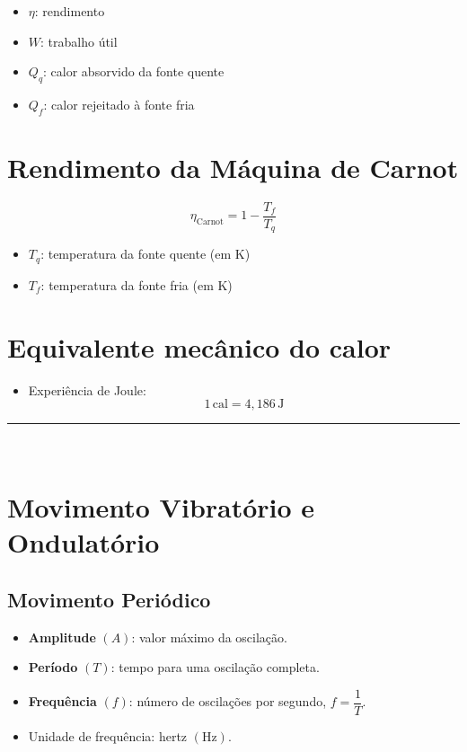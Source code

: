 \documentclass[a4paper,12pt]{article}
\begin{document}
\begin{multicols}{2}
\begin{itemize}
  \item \( \eta \): rendimento
  \item \( W \): trabalho útil
  \item \( Q_q \): calor absorvido da fonte quente
  \item \( Q_f \): calor rejeitado à fonte fria
\end{itemize}

\section{Rendimento da Máquina de Carnot}

\[
\eta_{\text{Carnot}} = 1 - \frac{T_f}{T_q}
\]

\begin{itemize}
  \item \( T_q \): temperatura da fonte quente (em K)
  \item \( T_f \): temperatura da fonte fria (em K)
\end{itemize}

\section{Equivalente mecânico do calor}
\begin{itemize}
    \item Experiência de Joule:
    \begin{equation}
        1 \, \text{cal} = 4{,}186 \, \text{J}
    \end{equation}
\end{itemize}

\noindent\rule{\linewidth}{1pt}\\

\section{Movimento Vibratório e Ondulatório}

\subsection{Movimento Periódico}
\begin{itemize}
    \item \textbf{Amplitude} $(A)$: valor máximo da oscilação.
    \item \textbf{Período} $(T)$: tempo para uma oscilação completa.
    \item \textbf{Frequência} $(f)$: número de oscilações por segundo, $f = \dfrac{1}{T}$.
    \item Unidade de frequência: hertz $(\text{Hz})$.
\end{itemize}


\end{multicols}
\end{document}

